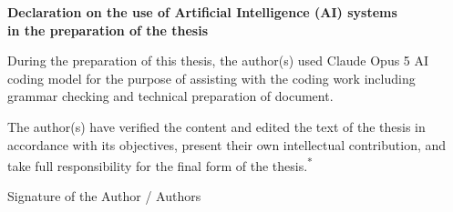 \clearpage
\thispagestyle{empty}
 
\begingroup
\setlength{\parindent}{0pt}
\setlength{\parskip}{\baselineskip}
 
\begin{center}
\textbf{Declaration on the use of Artificial Intelligence (AI) systems\\
in the preparation of the thesis}
\end{center}
 
\vspace{\baselineskip}
 
During the preparation of this thesis, the author(s) used Claude Opus 5 AI coding model
for the purpose of assisting with the coding work including grammar checking and technical preparation of document.
 
The author(s) have verified the content and edited the text of the thesis in
accordance with its objectives, present their own intellectual contribution,
and take full responsibility for the final form of the thesis.\textsuperscript{*}
 

 
\vspace{3\baselineskip}
 
\hspace*{0.45\textwidth}\begin{minipage}{0.5\textwidth}
\centering
\rule{0pt}{1pt}\dotfill\par
\vspace{2pt}
Signature of the Author / Authors
\end{minipage}
 
\endgroup
\clearpage